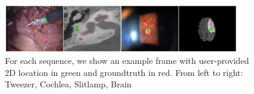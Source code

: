 \begin{figure}[t]
\centering
\includegraphics[width=0.9\textwidth]{pics/intro.png}
\caption{For each sequence, we show an example frame with user-provided 2D location in green and groundtruth in red. From left to right: Tweezer, Cochlea, Slitlamp, Brain}
\label{fig:intro}
\end{figure}



